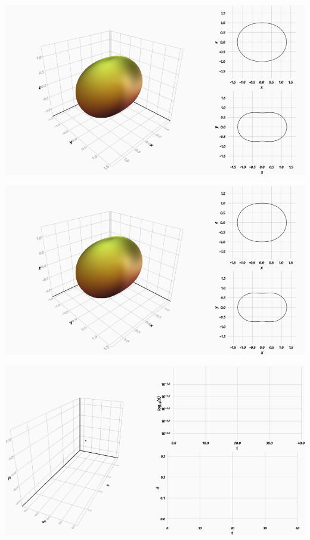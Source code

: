 \documentclass{beamer}
\begin{document}
\begin{frame}
	\includegraphics[width=\textwidth]{nucleus-with-sections}
\end{frame}


\begin{frame}
	\includegraphics[width=\textwidth]{nucleus-with-sections}
\end{frame}


\begin{frame}
	\includegraphics[width=\textwidth]{dist-with-log}
\end{frame}
\end{document}
